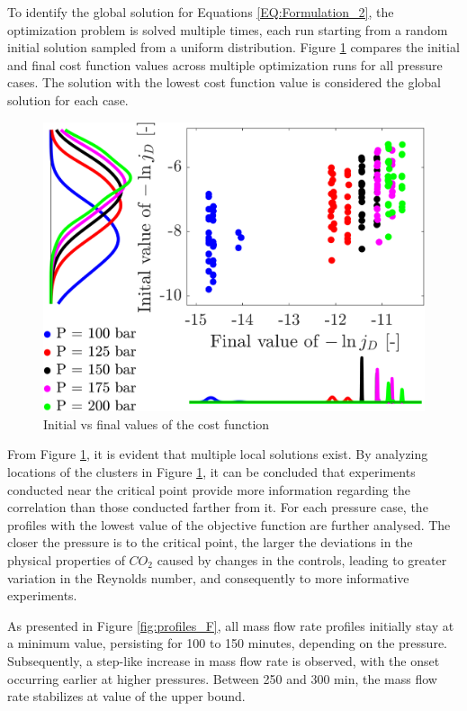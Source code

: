 \documentclass[../Article_Sensitivity_Analsysis.tex]{subfiles}
\begin{document}
	
	To identify the global solution for Equations \ref{EQ:Formulation_2}, the optimization problem is solved multiple times, each run starting from a random initial solution sampled from a uniform distribution. Figure \ref{fig:scatter} compares the initial and final cost function values across multiple optimization runs for all pressure cases. The solution with the lowest cost function value is considered the global solution for each case.
	
	\begin{figure}[h!]
		\centering
		\includegraphics[width=0.90\columnwidth]{Figures/Results/scatter.png}	
		\caption{Initial vs final values of the cost function}
		\label{fig:scatter}
	\end{figure}
	
	From Figure \ref{fig:scatter}, it is evident that multiple local solutions exist. By analyzing locations of the clusters in Figure \ref{fig:scatter}, it can be concluded that experiments conducted near the critical point provide more information regarding the correlation than those conducted farther from it. For each pressure case, the profiles with the lowest value of the objective function are further analysed. The closer the pressure is to the critical point, the larger the deviations in the physical properties of $CO_2$ caused by changes in the controls, leading to greater variation in the Reynolds number, and consequently to more informative experiments.
	
	As presented in Figure \ref{fig:profiles_F}, all mass flow rate profiles initially stay at a minimum value, persisting for 100 to 150 minutes, depending on the pressure. Subsequently, a step-like increase in mass flow rate is observed, with the onset occurring earlier at higher pressures. Between 250 and 300 min, the mass flow rate stabilizes at value of the upper bound.
	
\end{document}
